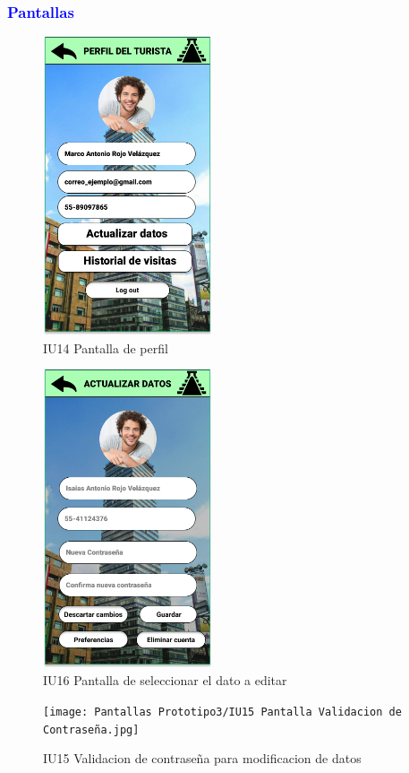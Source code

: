 \subsubsection{\textcolor{blue}{Pantallas}}
\begin{figure}[htbp]
        \centering
        \includegraphics[width= 5cm]{Pantallas Prototipo3/IU14 Pantalla de perfil.jpg}
        \caption{IU14 Pantalla de perfil}
        \label{fig:enter-label}
\end{figure}
\begin{figure}[htbp]
    \centering
    \includegraphics[width= 5cm]{Pantallas Prototipo3/IU16 Pantalla de seleccionar el dato a editar.jpg}
    \caption{IU16 Pantalla de seleccionar el dato a editar}
    \label{fig:enter-label}
\end{figure}

\begin{figure}[htbp]
        \centering
        \texttt{[image: Pantallas Prototipo3/IU15 Pantalla Validacion de Contraseña.jpg]}
        \caption{IU15 Validacion de contraseña para modificacion de datos}
        \label{fig:enter-label}
\end{figure}

